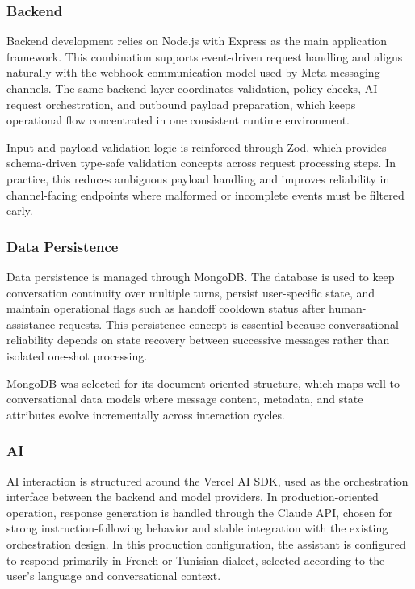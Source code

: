 \subsubsection{Backend}
Backend development relies on Node.js\cite{nodejs_docs} with Express\cite{express_docs} as the main application framework. This combination supports event-driven request handling and aligns naturally with the webhook communication model used by Meta messaging channels. The same backend layer coordinates validation, policy checks, AI request orchestration, and outbound payload preparation, which keeps operational flow concentrated in one consistent runtime environment.

Input and payload validation logic is reinforced through Zod\cite{zod_docs}, which provides schema-driven type-safe validation concepts across request processing steps. In practice, this reduces ambiguous payload handling and improves reliability in channel-facing endpoints where malformed or incomplete events must be filtered early.

\subsubsection{Data Persistence}
Data persistence is managed through MongoDB\cite{mongodb_docs}. The database is used to keep conversation continuity over multiple turns, persist user-specific state, and maintain operational flags such as handoff cooldown status after human-assistance requests. This persistence concept is essential because conversational reliability depends on state recovery between successive messages rather than isolated one-shot processing.

MongoDB was selected for its document-oriented structure, which maps well to conversational data models where message content, metadata, and state attributes evolve incrementally across interaction cycles.

\subsubsection{AI}
AI interaction is structured around the Vercel AI SDK\cite{vercel_ai_sdk_docs}, used as the orchestration interface between the backend and model providers. In production-oriented operation, response generation is handled through the Claude API\cite{anthropic_claude_api_docs}, chosen for strong instruction-following behavior and stable integration with the existing orchestration design.
In this production configuration, the assistant is configured to respond primarily in French or Tunisian dialect, selected according to the user's language and conversational context.

